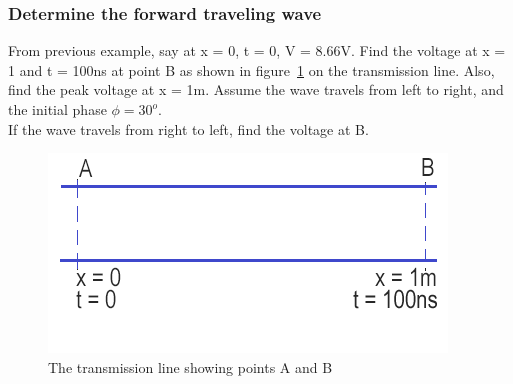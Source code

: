 \begin{exmp}
\subsubsection*{Determine the forward traveling wave}\label{exmp:forward}
From previous example, say at x = 0, t = 0, V = 8.66V. Find the voltage at x = 1 and t = 100ns at point B as shown in figure~\ref{fig:tl} on the transmission line. Also, find the peak voltage at x = 1m. Assume the wave travels from left to right, and the initial phase $\phi = 30^o$.\\
If the wave travels from right to left, find the voltage at B.
\begin{figure}[h]
\centering
\includegraphics[width=1\linewidth]{./graphics/TL}
\caption{The transmission line showing points A and B}
\label{fig:tl}
\end{figure}


\end{exmp}
